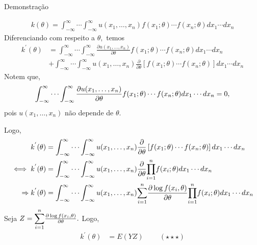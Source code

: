 \documentclass[12pt]{beamer}
\begin{document}
\begin{frame}{Demonstração}
\vspace{-0.2cm}
\begin{block}{}
\justifying
\begin{align*}
k(\theta) = \int_{-\infty}^{\infty} \cdots \int_{-\infty}^{\infty} u(x_1, \ldots, x_n) f(x_1; \theta) \cdots f(x_n; \theta)dx_1 \cdots dx_n
\end{align*}
Diferenciando com respeito a $\theta,$ temos
{\small
\begin{align*}
k^{'}(\theta) &= \int_{-\infty}^{\infty} \cdots \int_{-\infty}^{\infty} \frac{\partial u(x_1, \ldots, x_n)}{\partial\theta} f(x_1; \theta) \cdots f(x_n; \theta)dx_1 \cdots dx_n\\
&+\int_{-\infty}^{\infty} \cdots \int_{-\infty}^{\infty} u(x_1, \ldots, x_n)\frac{\partial }{\partial\theta}\left[f(x_1; \theta) \cdots f(x_n; \theta)\right] dx_1 \cdots dx_n
\end{align*}
}
Notem que, $${\small \int_{-\infty}^{\infty} \cdots \int_{-\infty}^{\infty} \frac{\partial u(x_1, \ldots, x_n)}{\partial\theta} f(x_1; \theta) \cdots f(x_n; \theta)dx_1 \cdots dx_n=0,}$$ pois $u(x_1, \ldots, x_n)$ não depende de $\theta.$
\end{block}
\end{frame}

\begin{frame}{}
\begin{block}{}
\justifying
Logo, 
{\small 
\begin{align*}
k^{'}(\theta) &= \int_{-\infty}^{\infty} \cdots \int_{-\infty}^{\infty} u(x_1, \ldots, x_n)\frac{\partial }{\partial\theta}\left[f(x_1; \theta) \cdots f(x_n; \theta)\right] dx_1 \cdots dx_n\\
\iff k^{'}(\theta) &= \int_{-\infty}^{\infty} \cdots \int_{-\infty}^{\infty} u(x_1, \ldots, x_n)\frac{\partial }{\partial\theta}{\displaystyle \prod_{i=1}^{n}} f(x_i; \theta) dx_1 \cdots dx_n\\
\Rightarrow k^{'}(\theta) &= \int_{-\infty}^{\infty} \cdots \int_{-\infty}^{\infty} u(x_1, \ldots, x_n){\displaystyle \sum_{i=1}^{n}} \frac{\partial \log{f(x_{i},\theta)}}{\partial\theta}{\displaystyle \prod_{i=1}^{n}} f(x_i; \theta) dx_1 \cdots dx_n
\end{align*}
}
Seja $Z={\displaystyle \sum_{i=1}^{n}} \frac{\partial \log{f(x_{i},\theta)}}{\partial\theta}.$ Logo,
\begin{align*}
k^{'}(\theta) &= E(YZ)\qquad~(\star\star\star)
\end{align*}
\end{block}
\end{frame}
\end{document}
